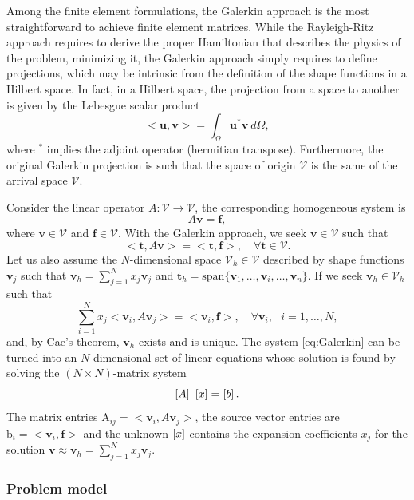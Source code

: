 Among the finite element formulations, the Galerkin approach is the most straightforward to achieve finite element matrices. While the Rayleigh-Ritz approach requires to derive the proper Hamiltonian that describes the physics of the problem,  minimizing it, the Galerkin approach simply requires to define projections, which may be intrinsic from the definition of the shape functions in a Hilbert space. In fact, in a Hilbert space, the projection from a space to another is given by the Lebesgue scalar product 
%
$$<\mathbf{u},\mathbf{v}> = \int_\Omega \mathbf{u}^* \mathbf{v} \ d\Omega,$$
%
\noindent where $^*$ implies the adjoint operator (hermitian transpose). Furthermore, the original Galerkin projection is such that the space of origin $\mathcal{V}$ is the same of the arrival space $\mathcal{V}$. 

Consider the linear operator $A : \mathcal{V} \longrightarrow \mathcal{V}$, the corresponding homogeneous system is
$$A \mathbf{v} = \mathbf{f},$$
\noindent where $\mathbf{v} \in \mathcal{V}$ and $\mathbf{f} \in \mathcal{V}$. With the Galerkin approach, we seek $\mathbf{v} \in \mathcal{V}$ such that
$$< \mathbf{t}, A \mathbf{v}> = <\mathbf{t},\mathbf{f}>, \quad \forall \mathbf{t} \in \mathcal{V}.$$
\noindent Let us also assume the $N$-dimensional space $\mathcal{V}_h\in \mathcal{V}$ described by shape functions $\mathbf{v}_j$ such that $\mathbf{v}_h = \sum_{j=1}^N x_j \mathbf{v}_j$ and $\mathbf{t}_h = \mathrm{span}\lbrace{\mathbf{v}_1, \ldots, \mathbf{v}_i, \ldots, \mathbf{v}_n}\rbrace$. If we seek $\mathbf{v}_h \in \mathcal{V}_h$ such that
\begin{equation}
\sum_{i=1}^N x_j < \mathbf{v}_i, A \mathbf{v}_j> = <\mathbf{v}_i,\mathbf{f}>, \quad \forall \mathbf{v}_i, \ \ \ i=1,\ldots,N,
\label{eq:Galerkin}
\end{equation}
%
\noindent and, by Cae's theorem, $\mathbf{v}_h$ exists and is unique. The system \eqref{eq:Galerkin} can be turned into an $N$-dimensional set of linear equations whose solution is found by solving the $(N \times N)$-matrix system
$$ \left[A\right] \ \left[{{x}}\right] = \left[{{b}}\right].$$
The matrix entries $\mathrm{A}_{ij} = < \mathbf{v}_i, A \mathbf{v}_j>$, the source vector entries are $\mathrm{b}_i = <\mathbf{v}_i,\mathbf{f}>$ and the unknown $\left[{{x}}\right]$ contains the expansion coefficients $x_j$ for the solution $\mathbf{v} \approx \mathbf{v}_h = \sum_{j=1}^N x_j \mathbf{v}_j$.


\subsubsection{Problem model}

